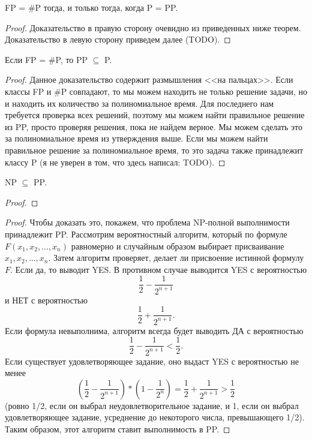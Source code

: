     
    \begin{Thm}
         FP = \#P тогда, и только тогда, когда P = PP.
    \end{Thm}
    \begin{proof}
        Доказательство в правую сторону очевидно из приведенных ниже теорем.\\
        Доказательство в левую сторону приведем далее (TODO).
    \end{proof}
    \begin{Thm}
        Если FP = \#P, то PP $\subseteq$ P.
    \end{Thm}
    \begin{proof}
        Данное доказательство содержит размышления <<на пальцах>>. Если классы FP и \#P совпадают, то мы можем находить не только решение задачи, но и находить их количество за полиномиальное время. Для последнего нам требуется проверка всех решений, поэтому мы можем найти правильное решение из PP, просто проверяя решения, пока не найдем верное. Мы можем сделать это за полиномиальное время из утверждения выше. Если мы можем найти правильное решение за полиномиальное время, то это задача также принадлежит классу P (я не уверен в том, что здесь написал: TODO).
    \end{proof}
    
    
    \begin{Thm}
        NP $\subseteq$ PP.
    \end{Thm}
    \begin{proof}
    \end{proof}
    \begin{proof}
        Чтобы доказать это, покажем, что проблема NP-полной выполнимости принадлежит PP. Рассмотрим вероятностный алгоритм, который по формуле $F(x_1, x_2, ..., x_n)$ равномерно и случайным образом выбирает присваивание $x_1, x_2, ..., x_n$. Затем алгоритм проверяет, делает ли присвоение истинной формулу $F$. Если да, то выводит YES. В противном случае выводится YES с вероятностью $$\frac{1}{2} - \frac{1}{2^{n+1}}$$ и НЕТ с вероятностью $$\frac{1}{2} + \frac{1}{2^{n+1}}.$$
        Если формула невыполнима, алгоритм всегда будет выводить ДА с вероятностью $$\frac{1}{2} - \frac{1}{2^{n+1}} < \frac{1}{2}.$$ Если существует удовлетворяющее задание, оно выдаст YES с вероятностью не менее $$(\frac{1}{2} - \frac{1}{2^{n+1}}) * (1 - \frac{1}{2^n}) = \frac{1}{2} + \frac{1}{2^{n+1}} > \frac{1}{2}$$ (ровно 1/2, если он выбрал неудовлетворительное задание, и 1, если он выбрал удовлетворяющее задание, усреднение до некоторого числа, превышающего 1/2). Таким образом, этот алгоритм ставит выполнимость в PP. 
    \end{proof}

